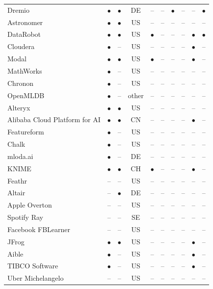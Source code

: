 \begin{table}[p]
{\begin{tabular}{l c c c c c c c c c}
Dremio & $\bullet$ & $\bullet$ & DE & -- & -- & $\bullet$ & -- & -- & $\bullet$ \\
Astronomer & $\bullet$ & $\bullet$ & US & -- & -- & -- & -- & -- & -- \\
DataRobot & $\bullet$ & $\bullet$ & US & $\bullet$ & -- & -- & -- & $\bullet$ & $\bullet$ \\
Cloudera & $\bullet$ & -- & US & -- & -- & -- & -- & $\bullet$ & -- \\
Modal & $\bullet$ & $\bullet$ & US & $\bullet$ & -- & -- & -- & $\bullet$ & -- \\
MathWorks & $\bullet$ & -- & US & -- & -- & -- & -- & -- & -- \\
Chronon & $\bullet$ & -- & US & -- & -- & -- & -- & -- & -- \\
OpenMLDB & $\bullet$ & -- & other & -- & -- & -- & -- & -- & -- \\
Alteryx & $\bullet$ & $\bullet$ & US & -- & -- & -- & -- & -- & -- \\
Alibaba Cloud Platform for AI & $\bullet$ & $\bullet$ & CN & -- & -- & -- & -- & $\bullet$ & -- \\
Featureform & $\bullet$ & -- & US & -- & -- & -- & -- & -- & -- \\
Chalk & $\bullet$ & -- & US & -- & -- & -- & -- & -- & -- \\
mloda.ai & $\bullet$ & -- & DE & -- & -- & -- & -- & -- & -- \\
KNIME & $\bullet$ & $\bullet$ & CH & $\bullet$ & -- & -- & -- & $\bullet$ & -- \\
Feathr & -- & -- & US & -- & -- & -- & -- & -- & -- \\
Altair & -- & $\bullet$ & DE & -- & -- & -- & -- & -- & -- \\
Apple Overton & -- & -- & US & -- & -- & -- & -- & -- & -- \\
Spotify Ray & -- & -- & SE & -- & -- & -- & -- & -- & -- \\
Facebook FBLearner & -- & -- & US & -- & -- & -- & -- & -- & -- \\
JFrog & $\bullet$ & $\bullet$ & US & -- & -- & -- & -- & $\bullet$ & -- \\
Aible & $\bullet$ & -- & US & -- & -- & -- & -- & $\bullet$ & -- \\
TIBCO Software & $\bullet$ & -- & US & -- & -- & -- & -- & $\bullet$ & -- \\
Uber Michelangelo & -- & -- & US & -- & -- & -- & -- & -- & -- \\
\bottomrule
\end{tabular}}
\end{table}
